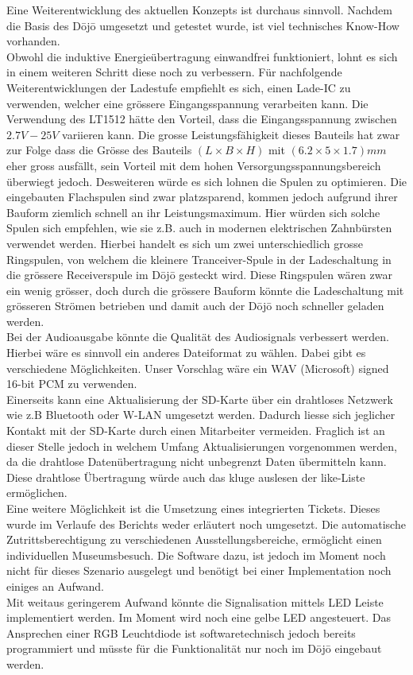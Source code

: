 Eine Weiterentwicklung des aktuellen Konzepts ist durchaus sinnvoll. Nachdem die Basis des Dōjō umgesetzt und getestet wurde, ist viel technisches \glqq Know-How \grqq vorhanden.\\
Obwohl die induktive Energieübertragung einwandfrei funktioniert, lohnt es sich in einem weiteren Schritt diese noch zu verbessern. Für nachfolgende Weiterentwicklungen der Ladestufe empfiehlt es sich, einen Lade-IC zu verwenden, welcher eine grössere Eingangsspannung verarbeiten kann. Die Verwendung des LT1512 hätte den Vorteil, dass die Eingangsspannung zwischen $2.7V - 25V$ variieren kann. Die grosse Leistungsfähigkeit dieses Bauteils hat zwar zur Folge dass die Grösse des Bauteils $(L \times B \times H)$ mit $(6.2\times 5\times 1.7)mm$ eher gross ausfällt, sein Vorteil mit dem hohen Versorgungsspannungsbereich überwiegt jedoch. Desweiteren würde es sich lohnen die Spulen zu optimieren. Die eingebauten Flachspulen sind zwar platzsparend, kommen jedoch aufgrund ihrer Bauform ziemlich schnell an ihr Leistungsmaximum. Hier würden sich solche Spulen sich empfehlen, wie sie z.B. auch in modernen elektrischen Zahnbürsten verwendet werden. Hierbei handelt es sich um zwei unterschiedlich grosse Ringspulen, von welchem die kleinere Tranceiver-Spule in der Ladeschaltung in die grössere Receiverspule  im Dōjō gesteckt wird. Diese Ringspulen wären zwar ein wenig grösser, doch durch die grössere Bauform könnte die Ladeschaltung mit grösseren Strömen betrieben und damit auch der Dōjō noch schneller geladen werden.\\
Bei der Audioausgabe könnte die Qualität des Audiosignals verbessert werden. Hierbei wäre es sinnvoll ein anderes Dateiformat zu wählen. Dabei gibt es verschiedene Möglichkeiten. Unser Vorschlag wäre ein WAV (Microsoft) signed 16-bit PCM zu verwenden.\\
Einerseits kann eine Aktualisierung der SD-Karte über ein drahtloses Netzwerk wie z.B Bluetooth oder W-LAN umgesetzt werden. Dadurch liesse sich jeglicher Kontakt mit der SD-Karte durch einen Mitarbeiter vermeiden. Fraglich ist an dieser Stelle jedoch in welchem Umfang Aktualisierungen vorgenommen werden, da die drahtlose Datenübertragung nicht unbegrenzt Daten übermitteln kann. Diese drahtlose Übertragung würde auch das kluge auslesen der like-Liste ermöglichen.\\
Eine weitere Möglichkeit ist die Umsetzung eines integrierten Tickets. Dieses wurde im Verlaufe des Berichts weder erläutert noch umgesetzt. Die automatische Zutrittsberechtigung zu verschiedenen Ausstellungsbereiche, ermöglicht einen individuellen Museumsbesuch. Die Software dazu, ist jedoch im Moment noch nicht für dieses Szenario ausgelegt und benötigt bei einer Implementation noch einiges an Aufwand.\\
Mit weitaus geringerem Aufwand könnte die Signalisation mittels LED Leiste implementiert werden. Im Moment wird noch eine gelbe LED angesteuert. Das Ansprechen einer RGB Leuchtdiode ist softwaretechnisch jedoch bereits programmiert und müsste für die Funktionalität nur noch im Dōjō eingebaut werden.